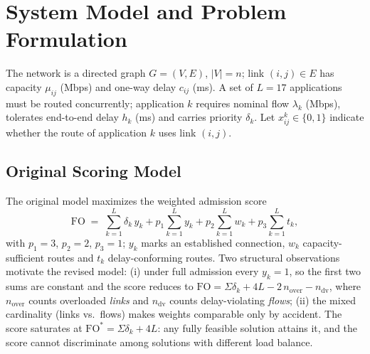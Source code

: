 \documentclass[journal]{IEEEtran}
\newcommand{\FO}{\mathrm{FO}}
\begin{document}
\section{System Model and Problem Formulation}
\label{sec:model}
The network is a directed graph $G=(V,E)$, $|V|=n$; link $(i,j)\in E$ has
capacity $\mu_{ij}$ (Mbps) and one-way delay $c_{ij}$ (ms). A set of $L=17$
applications must be routed concurrently; application $k$ requires nominal
flow $\lambda_k$ (Mbps), tolerates end-to-end delay $h_k$ (ms) and carries
priority $\delta_k$. Let $x_{ij}^{k}\in\{0,1\}$ indicate whether the route of
application $k$ uses link $(i,j)$.

\subsection{Original Scoring Model}
\label{sec:origfo}
The original model maximizes the weighted admission score
\begin{equation}
\FO \;=\; \sum_{k=1}^{L}\delta_k\,y_k
   + p_1\sum_{k=1}^{L} y_k
   + p_2\sum_{k=1}^{L} w_k
   + p_3\sum_{k=1}^{L} t_k,
\label{eq:fo}
\end{equation}
with $p_1{=}3$, $p_2{=}2$, $p_3{=}1$; $y_k$ marks an established connection,
$w_k$ capacity-sufficient routes and $t_k$ delay-conforming routes. Two
structural observations motivate the revised model: (i) under full admission
every $y_k=1$, so the first two sums are constant and the score reduces to
$\FO = \Sigma\delta_k + 4L - 2\,n_{\mathrm{over}} - n_{\mathrm{dv}}$, where
$n_{\mathrm{over}}$ counts overloaded \emph{links} and $n_{\mathrm{dv}}$
counts delay-violating \emph{flows}; (ii) the mixed cardinality (links vs.\
flows) makes weights comparable only by accident. The score saturates at
$\FO^{*}=\Sigma\delta_k+4L$: any fully feasible solution attains it, and the
score cannot discriminate among solutions with different load balance.
\end{document}
